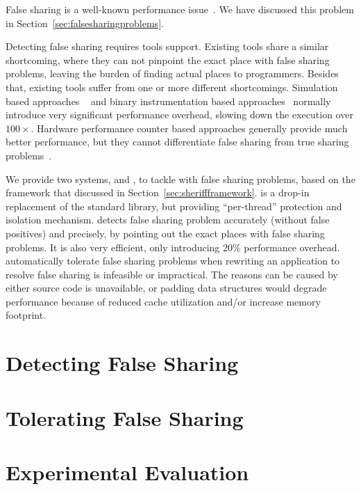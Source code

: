 \label{chapter:sherifftools}

False sharing is a well-known performance issue~\cite{falseshare:effect, falseshare:Analysis}. We have discussed this problem in Section~\ref{sec:falsesharingproblems}. 

Detecting false sharing requires tools support. Existing tools share a similar shortcoming, where they can not pinpoint the exact place with false sharing problems, leaving the burden of finding actual places to programmers. Besides that, existing tools suffer from one or more different shortcomings.  Simulation based approaches ~\cite{falseshare:simulator} and binary instrumentation based approaches~\cite{falseshare:binaryinstrumentation1, falseshare:binaryinstrumentation2} normally introduce very significant performance overhead, slowing down the execution over $100\times$. Hardware performance counter based approaches generally provide much better performance, but they cannot differentiate false sharing from true sharing problems~\cite{detect:ptu, detect:intel}.

We provide two systems, \SheriffDetect{} and \SheriffProtect{}, to tackle with false sharing problems, based on the \sheriff{} framework that discussed in Section~\ref{sec:sheriffframework}. \Sheriff{} is a drop-in replacement of the standard \pthreads{} library, but providing ``per-thread'' protection and isolation mechanism. \SheriffDetect{} detects false sharing problem accurately (without false positives) and precisely, by pointing out the exact places with false sharing problems. It is also very efficient, only introducing 20\% performance overhead.  \SheriffProtect{} automatically tolerate false sharing problems when rewriting an application to resolve false sharing is infeasible or impractical. The reasons can be caused by either source code is unavailable, or padding data structures would degrade performance because of reduced cache utilization and/or increase memory footprint.


%

\section{Detecting False Sharing}


\section{Tolerating False Sharing}


\section{Experimental Evaluation}


